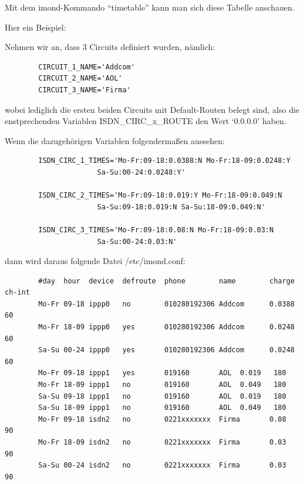   Mit dem imond-Kommando ``timetable'' kann man sich diese Tabelle
  anschauen.

  Hier ein Beispiel:

  Nehmen wir an, dass 3 Circuits definiert wurden, nämlich:

\begin{example}
\begin{verbatim}
        CIRCUIT_1_NAME='Addcom'
        CIRCUIT_2_NAME='AOL'
        CIRCUIT_3_NAME='Firma'
\end{verbatim}
\end{example}

  wobei lediglich die ersten beiden Circuits mit Default-Routen belegt
  sind, also die enstprechenden Variablen ISDN\_CIRC\_x\_ROUTE den
  Wert `0.0.0.0' haben.

  Wenn die dazugehörigen Variablen  folgendermaßen
  aussehen:

\begin{example}
\begin{verbatim}
        ISDN_CIRC_1_TIMES='Mo-Fr:09-18:0.0388:N Mo-Fr:18-09:0.0248:Y
                      Sa-Su:00-24:0.0248:Y'

        ISDN_CIRC_2_TIMES='Mo-Fr:09-18:0.019:Y Mo-Fr:18-09:0.049:N
                      Sa-Su:09-18:0.019:N Sa-Su:18-09:0.049:N'

        ISDN_CIRC_3_TIMES='Mo-Fr:09-18:0.08:N Mo-Fr:18-09:0.03:N
                      Sa-Su:00-24:0.03:N'
\end{verbatim}
\end{example}

  dann wird daraus folgende Datei /etc/imond.conf:

\begin{example}
\begin{verbatim}
        #day  hour  device  defroute  phone        name        charge  ch-int
        Mo-Fr 09-18 ippp0   no        010280192306 Addcom      0.0388   60
        Mo-Fr 18-09 ippp0   yes       010280192306 Addcom      0.0248   60
        Sa-Su 00-24 ippp0   yes       010280192306 Addcom      0.0248   60
        Mo-Fr 09-18 ippp1   yes       019160       AOL  0.019   180
        Mo-Fr 18-09 ippp1   no        019160       AOL  0.049   180
        Sa-Su 09-18 ippp1   no        019160       AOL  0.019   180
        Sa-Su 18-09 ippp1   no        019160       AOL  0.049   180
        Mo-Fr 09-18 isdn2   no        0221xxxxxxx  Firma       0.08     90
        Mo-Fr 18-09 isdn2   no        0221xxxxxxx  Firma       0.03     90
        Sa-Su 00-24 isdn2   no        0221xxxxxxx  Firma       0.03     90
\end{verbatim}
\end{example}

